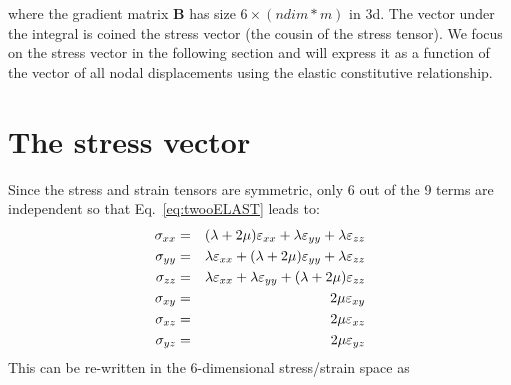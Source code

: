 where the gradient matrix ${\bm B}$ has size $6 \times (ndim*m)$ in 3d.
The vector under the integral is coined the stress vector (the cousin 
of the stress tensor). 
We focus on the stress vector in the following section
and will express it as a function of the vector of all nodal displacements
using the elastic constitutive relationship. 

\section{The stress vector}

Since the stress and strain tensors are symmetric, only 6 out of the 9 terms are independent
so that Eq.~\eqref{eq:twooELAST} leads to:
\begin{eqnarray}
\sigma_{xx} &=& (\lambda+2\mu)  \varepsilon_{xx} + \lambda \varepsilon_{yy} + \lambda \varepsilon_{zz} \nonumber\\
\sigma_{yy} &=& \lambda \varepsilon_{xx} + (\lambda+2\mu)  {\varepsilon}_{yy} + \lambda \varepsilon_{zz}\nonumber\\
\sigma_{zz} &=& \lambda \varepsilon_{xx} + \lambda \varepsilon_{yy} + (\lambda+2\mu)  {\varepsilon}_{zz} \nonumber\\
\sigma_{xy} &=& 2\mu  {\varepsilon}_{xy} \nonumber\\
\sigma_{xz} &=& 2\mu  {\varepsilon}_{xz} \nonumber\\
\sigma_{yz} &=& 2\mu  {\varepsilon}_{yz} 
\end{eqnarray}
This can be re-written in the 6-dimensional stress/strain space as
